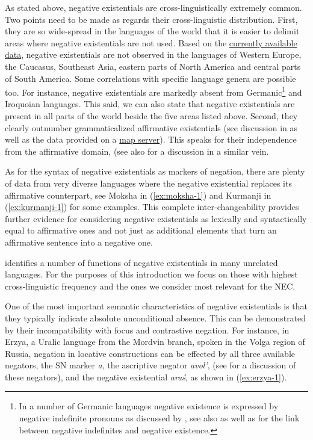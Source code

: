 \documentclass[output=paper,chinesefont,colorlinks,citecolor=brown]{langscibook}
\begin{document}
As stated above, negative existentials are cross-linguistically extremely common. Two points need to be made as regards their cross-linguistic distribution. First, they are so wide-spread in the languages of the world that it is easier to delimit areas where negative existentials are not used. Based on the \href{https://arcg.is/0uSu8P}{currently available data}, negative existentials are not observed in the languages of Western Europe, the Caucasus, Southeast Asia, eastern parts of North America and central parts of South America. Some correlations with specific language genera are possible too. For instance, negative existentials are markedly absent from Germanic\footnote{In a number of Germanic languages negative existence is expressed by negative indefinite pronouns as discussed by , see also \citet{Alsenoy2016} as well as \citet{Haspelmath1997} for the link between negative indefinites and negative existence.} and Iroquoian languages. This said, we can also state that negative existentials are present in all parts of the world beside the five areas listed above. Second, they clearly outnumber grammaticalized affirmative existentials (see discussion in \citep[117]{Veselinova2013} as well as the data provided on a \href{https://arcg.is/0uSu8P}{map server}). This speaks for their independence from the affirmative domain, (see also \citet[15]{Creissels2014} for a discussion in a similar vein.

As for the syntax of negative existentials as markers of negation, there are plenty of data from very diverse languages where the negative existential replaces its affirmative counterpart, see Moksha in (\ref{ex:moksha-1}) and Kurmanji in (\ref{ex:kurmanji-1}) for some examples. This complete inter-changeability provides further evidence for considering negative existentials as lexically and syntactically equal to affirmative ones and not just as additional elements that turn an affirmative sentence into a negative one.

\citet{Veselinova2013} identifies a number of functions of negative existentials in many unrelated languages. For the purposes of this introduction we focus on those with highest cross-linguistic frequency and the ones we consider most relevant for the NEC. 

One of the most important semantic characteristics of negative existentials is that they typically indicate absolute unconditional absence. This can be demonstrated by their incompatibility with focus and contrastive negation. For instance, in Erzya, a Uralic language from the Mordvin branch, spoken in the Volga region of Russia, negation in locative constructions can be effected by all three available negators, the SN marker \textit{a}, the ascriptive negator\textit{ avol’}, (see   for a discussion of these negators), and the negative existential \textit{araś}, as shown in (\ref{ex:erzya-1}).
\end{document}
